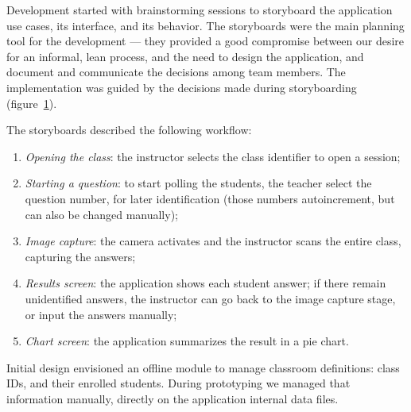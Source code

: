 Development started with brainstorming sessions to storyboard the application use cases, its interface, and its behavior. The storyboards were the main planning tool for the development --- they provided a good compromise between our desire for an informal, lean process, and the need to design the application, and document and communicate the decisions among team members. The implementation was guided by the decisions made during storyboarding (figure~\ref{fig:storyboard_2nd_cycle}).

\begin{figure}[ht]
    \centering
    \begin{minipage}{.5\textwidth}
        \centering
        \setlength{\fboxsep}{0pt}
        \label{fig:storyboard_2nd_cycle}
    \end{minipage}
\end{figure}

The storyboards described the following workflow:

\begin{enumerate}
    \item \textit{Opening the class}: the instructor selects the class identifier to open a session;
    \item \textit{Starting a question}: to start polling the students, the teacher select the question number, for later identification (those numbers autoincrement, but can also be changed manually);
    \item \textit{Image capture}: the camera activates and the instructor scans the entire class, capturing the answers;
    \item \textit{Results screen}: the application shows each student answer; if there remain unidentified answers, the instructor can go back to the image capture stage, or input the answers manually;
    \item \textit{Chart screen}: the application summarizes the result in a pie chart.
\end{enumerate}

Initial design envisioned an offline module to manage classroom definitions: class IDs, and their enrolled students. During prototyping we managed that information manually, directly on the application internal data files.

